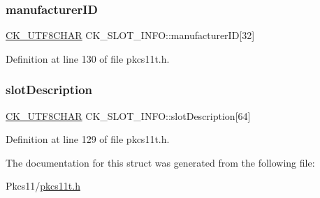 \subsubsection{\texorpdfstring{manufacturer\+ID}{manufacturerID}}
{\footnotesize\ttfamily \hyperlink{pkcs11t_8h_a0b0f8118c33f8a96a6af834bbab1df0c}{C\+K\+\_\+\+U\+T\+F8\+C\+H\+AR} C\+K\+\_\+\+S\+L\+O\+T\+\_\+\+I\+N\+F\+O\+::manufacturer\+ID\mbox{[}32\mbox{]}}



Definition at line 130 of file pkcs11t.\+h.

\mbox{\label{struct_c_k___s_l_o_t___i_n_f_o_a54a968ef99d631f025b426d32fe13648}} 
\subsubsection{\texorpdfstring{slot\+Description}{slotDescription}}
{\footnotesize\ttfamily \hyperlink{pkcs11t_8h_a0b0f8118c33f8a96a6af834bbab1df0c}{C\+K\+\_\+\+U\+T\+F8\+C\+H\+AR} C\+K\+\_\+\+S\+L\+O\+T\+\_\+\+I\+N\+F\+O\+::slot\+Description\mbox{[}64\mbox{]}}



Definition at line 129 of file pkcs11t.\+h.



The documentation for this struct was generated from the following file\+:\begin{DoxyCompactItemize}
\item 
Pkcs11/\hyperlink{pkcs11t_8h}{pkcs11t.\+h}\end{DoxyCompactItemize}
